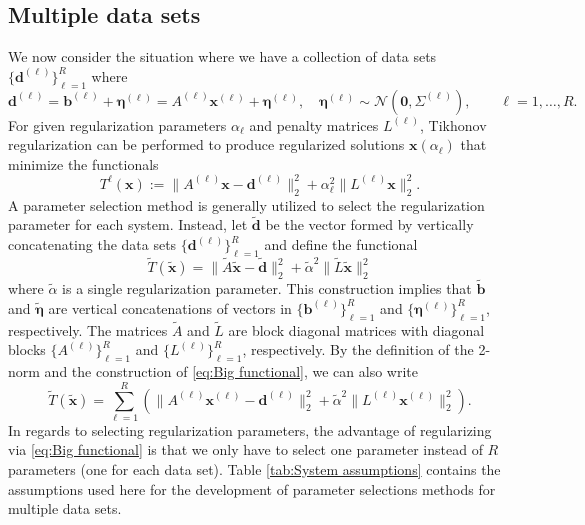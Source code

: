 \documentclass[12pt]{article}
\newcommand{\bVec}{\mathbf{b}}	%
\newcommand{\dVec}{\mathbf{d}}	%
\newcommand{\xVec}{\mathbf{x}}	%
\newcommand{\regparam}{\alpha}
\newcommand{\noise}{\eta}	%
\newcommand{\noiseVec}{\bm{\noise}}	%
\begin{document}
\subsection{Multiple data sets}
We now consider the situation where we have a collection of data sets $\{\dVec^{(\ell)}\}_{\ell=1}^R$ where 
\begin{equation}
\label{eq:Big vectors}
\dVec^{(\ell)} = \bVec^{(\ell)} + \noiseVec^{(\ell)} = {A^{(\ell)}}\xVec^{(\ell)} + \noiseVec^{(\ell)}, \quad \noiseVec^{(\ell)} \sim \mathcal{N}(\bm{0},\Sigma^{(\ell)}), \qquad \ell = 1,\ldots,R.
\end{equation}
For given regularization parameters $\regparam_\ell$ and penalty matrices $L^{(\ell)}$, Tikhonov regularization can be performed to produce regularized solutions $\xVec(\regparam_\ell)$ that minimize the functionals
\begin{equation}
T^\ell(\xVec) := \|A^{(\ell)}\xVec - \dVec^{(\ell)}\|_2^2 + \regparam_\ell^2\|L^{(\ell)}\xVec\|_2^2.
\end{equation}
A parameter selection method is generally utilized to select the regularization parameter for each system. Instead, let $\widetilde{\dVec}$ be the vector formed by vertically concatenating the data sets $\{\dVec^{(\ell)}\}_{\ell=1}^R$ and define the functional
\begin{equation}
\label{eq:Big functional}
\widetilde{T}(\widetilde{\xVec}) = \|\widetilde{A}\widetilde{\xVec} - \widetilde{\dVec}\|_2^2 + \widetilde{\regparam}^2\|\widetilde{L}\widetilde{\xVec}\|_2^2
\end{equation}
where $\widetilde{\regparam}$ is a single regularization parameter. This construction implies that $\widetilde{\bVec}$ and $\widetilde{\noiseVec}$ are vertical concatenations of vectors in $\{\bVec^{(\ell)}\}_{\ell=1}^R$ and $\{\noiseVec^{(\ell)}\}_{\ell=1}^R$, respectively. The matrices $\widetilde{A}$ and $\widetilde{L}$ are block diagonal matrices with diagonal blocks $\{A^{(\ell)}\}_{\ell=1}^R$ and $\{L^{(\ell)}\}_{\ell=1}^R$, respectively. By the definition of the 2-norm and the construction of \eqref{eq:Big functional}, we can also write
\begin{equation}
\label{eq:Big functional 2}
\widetilde{T}(\widetilde{\xVec}) = \sum_{\ell = 1}^R \left(\|A^{(\ell)}\xVec^{(\ell)} - \dVec^{(\ell)}\|_2^2 + \widetilde{\regparam}^2\|L^{(\ell)} \xVec^{(\ell)}\|_2^2\right).
\end{equation}
In regards to selecting regularization parameters, the advantage of regularizing via \eqref{eq:Big functional} is that we only have to select one parameter instead of $R$ parameters (one for each data set). Table \ref{tab:System assumptions} contains the assumptions used here for the development of parameter selections methods for multiple data sets.
\end{document}
